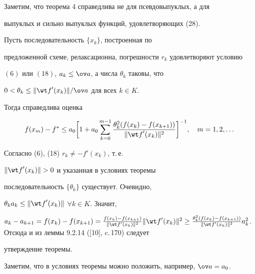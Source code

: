 Заметим, что теорема 4 справедлива не для псевдовыпуклых, а для


выпуклых и сильно выпуклых функций, удовлетворяющих (28).





\begin{thm}


Пусть последовательность $\{{x_k} \}$, построенная по


предложенной схеме, релаксационна, погрешности $r_k$ удовлетворяют условию


$(6)$ или $(18)$, $a_k\le \ov a$, а числа $\theta_k$ таковы, что


$0<\theta_k\le \|{{\wt f}'(x_k)} \|/\ov a$ для всех $k\in K$.


Тогда справедлива оценка


$$


f(x_m)-f^*\le a_0 \bigg[ {1+a_0\sum_{k=0}^{m-1}


\frac{\theta_k^2(f(x_k)-f(x_{k+1}))}{\|{{\wt f}'(x_k)


} \|^2}} \bigg]^{-1},\quad m=1,2,\dotsc


$$


\end{thm}





\begin{pf}


Согласно (6), (18) $r_k\neq -{f}'(x_k)$, т.\,е.


$\|{{\wt f}'(x_k)} \|>0$ и указанная в условиях теоремы


последовательность $ \{{\theta_k} \} $ существует. Очевидно,


$\theta_ka_k\le \|{{\wt f}'(x_k)} \|$ $\forall k\in K$. Значит,


$a_k-a_{k+1}=f(x_k)-f(x_{k+1})=\frac{f(x_k)-f(x_{k+1})}{\|{{\wt


f}'(x_k)} \|^2} \|{{\wt f}'(x_k)} \|^2\ge


\frac{\theta_k^2(f(x_k)-f(x_{k+1}))}{\|{{\wt f}'(x_k)} 


\|^2} a_k^2$. Отсюда и из леммы 9.2.14 ([10], c.\,170) следует


утверждение теоремы.


\end{pf}





Заметим, что в условиях теоремы можно положить, например, $\ov a=a_0$.


